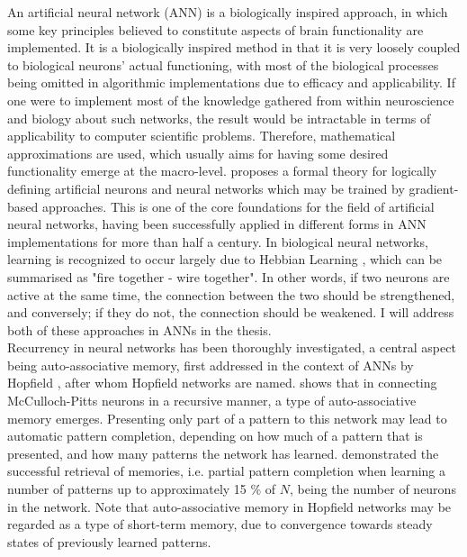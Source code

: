 An artificial neural network (ANN) is a biologically inspired approach, in which some key principles believed to constitute aspects of brain functionality are implemented. It is a biologically inspired method in that it is very loosely coupled to biological neurons' actual functioning, with most of the biological processes being omitted in algorithmic implementations due to efficacy and applicability. If one were to implement most of the knowledge gathered from within neuroscience and biology about such networks, the result would be intractable in terms of applicability to computer scientific problems. Therefore, mathematical approximations are used, which usually aims for having some desired functionality emerge at the macro-level. \citet{McCulloch1943} proposes a formal theory for logically defining artificial neurons and neural networks which may be trained by gradient-based approaches. This is one of the core foundations for the field of artificial neural networks, having been successfully applied in different forms in ANN implementations for more than half a century.
In biological neural networks, learning is recognized to occur largely due to Hebbian Learning \citep{Hebb1949}, which can be summarised as "fire together - wire together". In other words, if two neurons are active at the same time, the connection between the two should be strengthened, and conversely; if they do not, the connection should be weakened.
I will address both of these approaches in ANNs in the thesis.
\\

Recurrency in neural networks has been thoroughly investigated, a central aspect being auto-associative memory, first addressed in the context of ANNs by Hopfield \citep{Hopfield1982}, after whom Hopfield networks are named. \citet{Hopfield1982} shows that in connecting McCulloch-Pitts neurons \citep{McCulloch1943} in a recursive manner, a type of auto-associative memory emerges. Presenting only part of a pattern to this network may lead to automatic pattern completion, depending on how much of a pattern that is presented, and how many patterns the network has learned. \citet{Hopfield1982} demonstrated the successful retrieval of memories, i.e. partial pattern completion when learning a number of patterns up to approximately 15 \% of $N$, being the number of neurons in the network. Note that auto-associative memory in Hopfield networks may be regarded as a type of short-term memory, due to convergence towards steady states of previously learned patterns.

